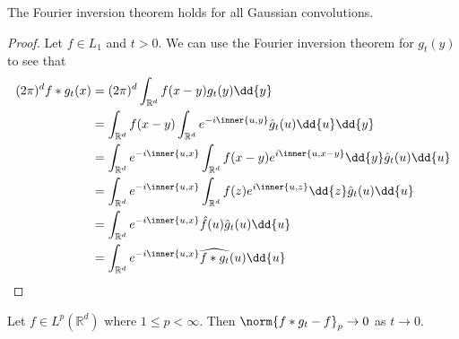 \begin{lemma}
	The Fourier inversion theorem holds for all Gaussian convolutions.
\end{lemma}

\begin{proof}
	Let $f \in L_1$ and $t > 0$.
	We can use the Fourier inversion theorem for $g_t(y)$ to see that
	\begin{align*}
		(2\pi)^d f \ast g_t(x) &= (2\pi)^d \int_{\mathbb R^d} f(x-y) g_t(y) \dd{y} \\
		&= \int_{\mathbb R^d} f(x-y) \int_{\mathbb R^d} e^{-i\inner{u,y}} \hat g_t(u) \dd{u} \dd{y} \\
		&= \int_{\mathbb R^d} e^{-i\inner{u,x}} \int_{\mathbb R^d} f(x-y) e^{i\inner{u,x-y}} \dd{y} \hat g_t(u) \dd{u} \\
		&= \int_{\mathbb R^d} e^{-i\inner{u,x}} \int_{\mathbb R^d} f(z) e^{i\inner{u,z}} \dd{z} \hat g_t(u) \dd{u} \\
		&= \int_{\mathbb R^d} e^{-i\inner{u,x}} \hat f(u) \hat g_t(u) \dd{u} \\
		&= \int_{\mathbb R^d} e^{-i\inner{u,x}} \widehat{f \ast g_t}(u) \dd{u}
	\end{align*}
\end{proof}


\begin{lemma}
	Let $f \in L^p(\mathbb{R}^d)$ where $1 \leq p < \infty$.
	Then $\norm{f \ast g_t - f}_p \to 0$ as $t \to 0$.
\end{lemma}

